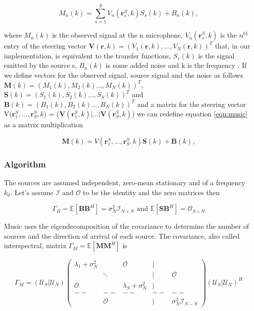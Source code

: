 \begin{equation}
    M_n(k) = \sum_{s=1}^S V_n(\boldsymbol r^S_s,k)S_s(k) + B_n(k),
    \label{equ:music}
\end{equation}

where $M_n(k)$ is the observed signal at the n microphone, $V_n(\boldsymbol r^S_s,k)$ is the $n^{th}$ entry of the steering vector  $\boldsymbol V(\boldsymbol r,k) = (V_1(\boldsymbol r,k), ... ,V_N(\boldsymbol r,k))^T$  that, in our implementation, is equivalent to the transfer functions, $S_s(k)$ is the signal emitted by the source s, $B_n(k)$ is some added noise and k is the frequency \cite{musicRobo}\cite{musciIEEE}. If we define vectors for the observed signal, source signal and the noise as follows $\boldsymbol M(k) = (M_1(k), M_2(k) ..., M_N(k))^T$, $\boldsymbol S(k) = (S_1(k), S_2(k) ..., S_S(k))^T$ and $\boldsymbol B(k) = (B_1(k), B_2(k) ... ,B_N(k))^T$ and a matrix for the steering vector V($\boldsymbol r^S_1, ..., \boldsymbol r^S_S, k$) = ($\boldsymbol V(\boldsymbol r^S_1,k)|...|\boldsymbol V(\boldsymbol r^S_S,k)$) we can redefine equation \ref{equ:music} as a matrix multiplication \cite{musicRobo}

\begin{equation}
    \boldsymbol M(k) =  V(\boldsymbol r^S_1, ..., \boldsymbol r^S_S, k)\boldsymbol S(k) + \boldsymbol B(k),
\end{equation}


\subsubsection{Algorithm}

The sources are assumed independent, zero-mean stationary and of a frequency $k_0$. Let's assume $\mathcal{I}$ and $\mathcal{O}$ to be the identity and the zero matrices then 

\begin{equation}
    \Gamma _B = \mathbb{E}[\boldsymbol B \boldsymbol B^H] = \sigma_N^2 \mathcal{I}_{N \times N} \text{ and } \mathbb{E}[\boldsymbol S \boldsymbol B^H] = \mathcal{O}_{S \times N}
\end{equation}

Music uses the eigendecomposition of the covariance to determine the number of sources and the direction of arrival of each source. The covariance, also called interspectral, matrix $\Gamma _M = \mathbb{E}[\boldsymbol M\boldsymbol M^H]$ is 

\begin{equation}
    \Gamma _M = (\mathcal{U}_S | \mathcal{U}_N) 
    \begin{pmatrix}
        \lambda_1 + \sigma_N^2 &  & \mathcal{O} & | &  \\
         & \ddots &  & | & \mathcal{O}   \\
        \mathcal{O} &   & \lambda_S + \sigma_N^2 & | &  \\
        -- & -- & -- & -- & -- \\
         & \mathcal{O} &  & | & \sigma_N^2 \mathcal{I}_{N - S}
    \end{pmatrix}
    (\mathcal{U}_S | \mathcal{U}_N)^H
\end{equation}

